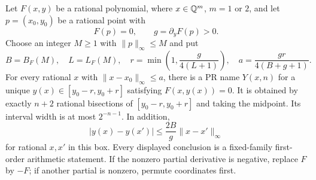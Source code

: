 \begin{theorem}
\label{tan:implicit}
Let $F(x,y)$ be a rational polynomial, where $x\in\mathbb Q^m$,
$m=1$ or $2$, and let $p=(x_0,y_0)$ be a rational point with
\[
 F(p)=0,\qquad g=\partial_yF(p)>0.
\]
Choose an integer $M\ge1$ with $\|p\|_\infty\le M$ and put
\[
 B=B_F(M),\quad L=L_F(M),\quad
 r=\min\left(1,\frac{g}{4(L+1)}\right),\quad
 a=\frac{gr}{4(B+g+1)}.
\]
For every rational $x$ with $\|x-x_0\|_\infty\le a$, there is
a PR name $Y(x,n)$ for a unique $y(x)\in[y_0-r,y_0+r]$ satisfying
$F(x,y(x))=0$. It is obtained by exactly $n+2$ rational bisections
of $[y_0-r,y_0+r]$ and taking the midpoint. Its interval width is
at most $2^{-n-1}$. In addition,
\[
 |y(x)-y(x')|\le\frac{2B}{g}\|x-x'\|_\infty
\]
for rational $x,x'$ in this box. Every displayed conclusion is a
fixed-family first-order arithmetic statement. If the nonzero partial
derivative is negative, replace $F$ by $-F$; if another partial is
nonzero, permute coordinates first.
\end{theorem}
